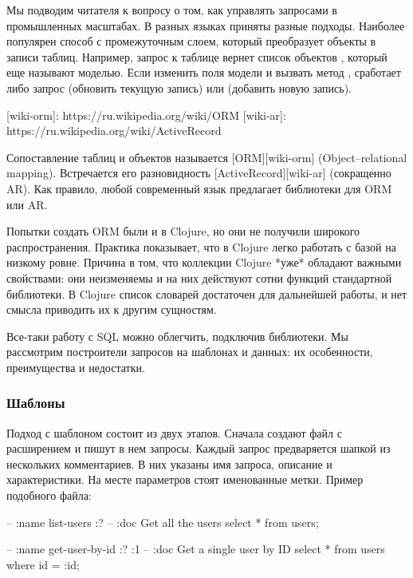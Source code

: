 Мы подводим читателя к вопросу о том, как управлять запросами в промышленных масштабах. В разных языках приняты разные подходы. Наиболее популярен способ с промежуточным слоем, который преобразует объекты в записи таблиц. Например, запрос к таблице  вернет список объектов , который еще называют моделью. Если изменить поля модели и вызвать метод , сработает либо запрос  (обновить текущую запись) или  (добавить новую запись).

[wiki-orm]: https://ru.wikipedia.org/wiki/ORM
[wiki-ar]: https://ru.wikipedia.org/wiki/ActiveRecord

Сопоставление таблиц и объектов называется [ORM][wiki-orm] (Object–relational mapping). Встречается его разновидность [ActiveRecord][wiki-ar] (сокращенно AR). Как правило, любой современный язык предлагает библиотеки для ORM или AR.

Попытки создать ORM были и в Clojure, но они не получили широкого распространения. Практика показывает, что в Clojure легко работать с базой на низкому ровне. Причина в том, что коллекции Clojure *уже* обладают важными свойствами: они неизменяемы и на них действуют сотни функций стандартной библиотеки. В Clojure список словарей достаточен для дальнейшей работы, и нет смысла приводить их к другим сущностям.

Все-таки работу с SQL можно облегчить, подключив библиотеки. Мы рассмотрим построители запросов на шаблонах и данных: их особенности, преимущества и недостатки.

\subsubsection{Шаблоны}

Подход с шаблоном состоит из двух этапов. Сначала создают файл с расширением  и пишут в нем запросы. Каждый запрос предваряется шапкой из нескольких комментариев. В них указаны имя запроса, описание и характеристики. На месте параметров стоят именованные метки. Пример подобного файла:

\begin{english}
  \begin{sql}
-- :name list-users :?
-- :doc Get all the users
select * from users;

-- :name get-user-by-id :? :1
-- :doc Get a single user by ID
select * from users
where id = :id;
  \end{sql}
\end{english}

